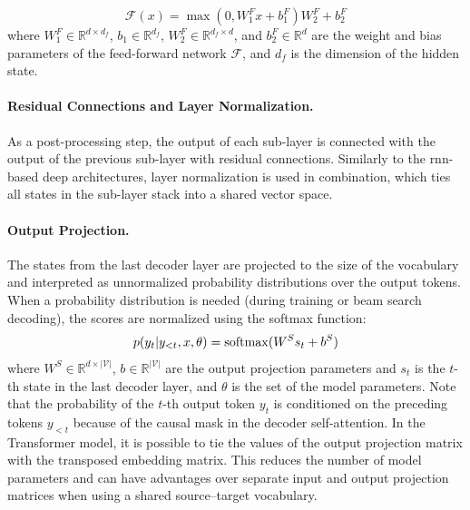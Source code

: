 \begin{equation}
  \mathcal{F}(x) = \max(0, W_1^Fx + b_1^F)W_2^F + b_2^F
\end{equation}
where $W_1^F \in \mathbb{R}^{d \times d_f}$, $b_1 \in \mathbb{R}^{d_f}$,
$W_2^F \in \mathbb{R}^{d_f \times d}$, and $b_2^F \in \mathbb{R}^d$ are the
weight and bias parameters of the feed-forward network $\mathcal{F}$, and $d_f$
is the dimension of the hidden state.

\paragraph{Residual Connections and Layer Normalization.} As a post-processing
step, the output of each sub-layer is connected with the output of the previous
sub-layer with residual connections.  Similarly to the \acs{rnn}-based
deep architectures, layer normalization is used in combination, which ties all
states in the sub-layer stack into a shared vector space.

\paragraph{Output Projection.} The states from the last decoder layer are
projected to the size of the vocabulary and interpreted as unnormalized
probability distributions over the output tokens. When a probability
distribution is needed (during training or beam search decoding), the scores
are normalized using the softmax function:
%
\begin{equation}
  p(y_t | y_{<t}, x, \theta) = \operatorname*{softmax}( W^S s_t + b^S )
\end{equation}
%
where $W^S \in \mathbb{R}^{d \times |\mathcal{V}|}$,
$b \in \mathbb{R}^{|\mathcal{V}|}$ are the output projection parameters and
$s_t$ is the $t$-th state in the last decoder layer, and $\theta$ is the set of
the model parameters. Note that the probability of the $t$-th output token
$y_t$ is conditioned on the preceding tokens $y_{<t}$ because of the causal
mask in the decoder self-attention. In the Transformer model, it is possible to
tie the values of the output projection matrix with the transposed embedding
matrix. This reduces the number of model parameters and can have advantages
over separate input and output projection matrices when using a shared
source--target vocabulary.

